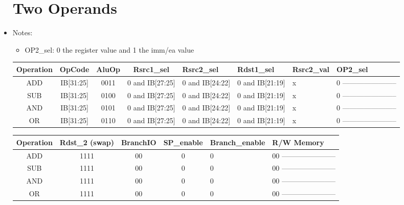 \documentclass[12pt]{report}
\begin{document}
\begin{itemize}
        \section{Two Operands}
        \item Notes:
        \begin{itemize}
            \item OP2_sel: 0 the register value and 1 the imm/ea value
        \end{itemize}

        \begin{center}
        \begin{tabular}{||c| c| c| c| p{40mm}||} 
        \hline
        Operation & OpCode & AluOp & Rsrc1_sel & Rsrc2_sel & Rdst1_sel & Rsrc2_val & OP2_sel  \\ [0.5ex] 
        \hline\hline
        ADD & IB[31:25] & 0011 & 0 and IB[27:25] & 0 and IB[24:22] & 0 and IB[21:19] & x & 0 ----------------------- \\
        \hline
        SUB & IB[31:25] & 0100 & 0 and IB[27:25] & 0 and IB[24:22] & 0 and IB[21:19] & x & 0 ----------------------- \\
        \hline
        AND & IB[31:25] & 0101 & 0 and IB[27:25] & 0 and IB[24:22] & 0 and IB[21:19] & x & 0 ----------------------- \\
        \hline
        OR  & IB[31:25] & 0110 & 0 and IB[27:25] & 0 and IB[24:22] & 0 and IB[21:19] & x & 0 ----------------------- \\
        \hline

        \end{tabular}
        \end{center}

        \begin{center}
        \begin{tabular}{||c| c| c| c| p{40mm}||} 
        \hline
        Operation & Rdst_2 (swap) & BranchIO & SP_enable & Branch_enable & R/W Memory  \\ [0.5ex] 
        \hline\hline
        ADD & 1111 & 00 & 0 & 0 & 00 ----------------------- \\
        \hline
        SUB & 1111 & 00 & 0 & 0 & 00 ----------------------- \\
        \hline
        AND & 1111 & 00 & 0 & 0 & 00 ----------------------- \\
        \hline
        OR  & 1111 & 00 & 0 & 0 & 00 ----------------------- \\
        \hline


\end{tabular}
\end{center}
\end{itemize}
\end{document}
